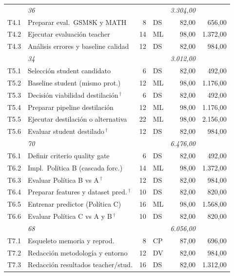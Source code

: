 \documentclass[11pt,a4paper]{article}
\begin{document}
{\begin{tabularx}{\textwidth}{>{\ttfamily}l >{\raggedright\arraybackslash}X r l r r}
\multicolumn{2}{r}{\textit{Subtotal F3}} & \textit{36} & & & \textit{3.304,00} \\
\addlinespace[1.5pt]
T4.1 & Preparar eval.\ GSM8K y MATH & 8 & DS & 82,00 & 656,00 \\
T4.2 & Ejecutar evaluación teacher & 14 & ML & 98,00 & 1.372,00 \\
T4.3 & Análisis errores y baseline calidad & 12 & DS & 82,00 & 984,00 \\
\multicolumn{2}{r}{\textit{Subtotal F4}} & \textit{34} & & & \textit{3.012,00} \\
\addlinespace[1.5pt]
T5.1 & Selección student candidato & 6 & DS & 82,00 & 492,00 \\
T5.2 & Baseline student (mismo prot.) & 12 & ML & 98,00 & 1.176,00 \\
T5.3 & Decisión viabilidad destilación$\,^\dagger$ & 6 & DS & 82,00 & 492,00 \\
T5.4 & Preparar pipeline destilación & 12 & ML & 98,00 & 1.176,00 \\
T5.5 & Ejecutar destilación o alternativa & 22 & ML & 98,00 & 2.156,00 \\
T5.6 & Evaluar student destilado$\,^\dagger$ & 12 & DS & 82,00 & 984,00 \\
\multicolumn{2}{r}{\textit{Subtotal F5}} & \textit{70} & & & \textit{6.476,00} \\
\addlinespace[1.5pt]
T6.1 & Definir criterio quality gate & 6 & DS & 82,00 & 492,00 \\
T6.2 & Impl.\ Política B (cascada forc.) & 14 & ML & 98,00 & 1.372,00 \\
T6.3 & Evaluar Política B vs A$\,^\dagger$ & 12 & DS & 82,00 & 984,00 \\
T6.4 & Preparar features y dataset pred.$\,^\dagger$ & 10 & DS & 82,00 & 820,00 \\
T6.5 & Entrenar predictor (Política C) & 16 & ML & 98,00 & 1.568,00 \\
T6.6 & Evaluar Política C vs A y B$\,^\dagger$ & 10 & DS & 82,00 & 820,00 \\
\multicolumn{2}{r}{\textit{Subtotal F6}} & \textit{68} & & & \textit{6.056,00} \\
\addlinespace[1.5pt]
T7.1 & Esqueleto memoria y reprod. & 8 & CP & 87,00 & 696,00 \\
T7.2 & Redacción metodología y entorno & 12 & DV & 82,00 & 984,00 \\
T7.3 & Redacción resultados teacher/stud. & 16 & DS & 82,00 & 1.312,00 \\

\end{tabularx}}
\end{document}
